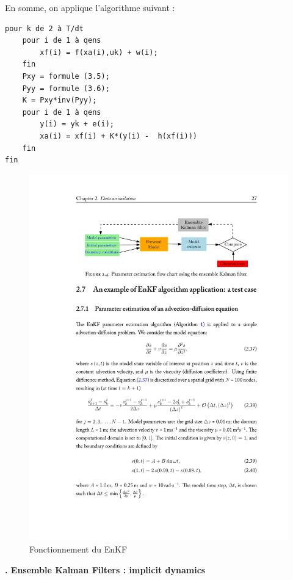 \documentclass[a4paper]{article}
\newcounter{c}
\newcounter{d}
\newcounter{r}
\newcounter{e}
\newcommand{\chapitre}[1]{\stepcounter{c}\setcounter{e}{0}\setcounter{d}{0}\setcounter{r}{0}\noindent\textbf{\Large\arabic{c}. #1}\\}
\begin{document}
En somme, on applique l'algorithme suivant :

\begin{verbatim}
pour k de 2 à T/dt
    pour i de 1 à qens
        xf(i) = f(xa(i),uk) + w(i);
    fin
    Pxy = formule (3.5);
    Pyy = formule (3.6);
    K = Pxy*inv(Pyy);
    pour i de 1 à qens
        y(i) = yk + e(i);
        xa(i) = xf(i) + K*(y(i) -  h(xf(i)))
    fin
fin
\end{verbatim}


\begin{figure}
\includegraphics[width=\textwidth,trim = 3.85cm 22.1cm 1.8cm 3.5cm, clip]{enkfchart.pdf}
\caption{Fonctionnement du EnKF}
\end{figure}





\chapitre{Ensemble Kalman Filters : implicit dynamics}
\end{document}
